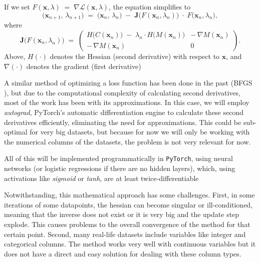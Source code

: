 \documentclass[12pt]{extarticle}
\numberwithin{equation}{section}
\begin{document}
If we set $F(\mathbf{x},\lambda) \;=\;\nabla \mathcal{L}(\mathbf{x},\lambda)$, 
the equation simplifies to
\begin{equation}\label{eq:newton_simplified}
\bigl(\mathbf{x}_{n+1},\,\lambda_{n+1}\bigr)
\;=\;
\bigl(\mathbf{x}_n,\,\lambda_n\bigr)
\;-\;
\mathbf{J}\!\bigl(F(\mathbf{x}_n,\lambda_n)\bigr)
\;\cdot\;
F\!\bigl(\mathbf{x}_n,\lambda_n\bigr),
\end{equation}
where
\begin{equation}\label{eq:hessian}
\mathbf{J}\!\bigl(F(\mathbf{x}_n,\lambda_n)\bigr)
\;=\;
\begin{pmatrix}
H\!\bigl(C(\mathbf{x}_n)\bigr)\;-\;\lambda_n \cdot H\!\bigl(M(\mathbf{x}_n)\bigr) 
    & -\,\nabla M(\mathbf{x}_n)
\\[6pt]
-\,\nabla M(\mathbf{x}_n)
    & 0
\end{pmatrix}.
\end{equation}
Above, $H(\cdot)$ denotes the Hessian (second derivative) with respect to $\mathbf{x}$, 
and $\nabla(\cdot)$ denotes the gradient (first derivative)

A similar method of optimizing a loss function has been done in the past (BFGS \cite{papakonstantinou2009historical}), 
but due to the computational complexity of calculating second derivatives, most of the work has been with its approximations. In this case, we will employ \emph{autograd}, PyTorch's automatic differentiation engine to calculate these second derivatives efficiently, eliminating the need for approximations. This could be sub-optimal for very big datasets, but because for now we will only be working with the numerical columns of the datasets, the problem is not very relevant for now.

All of this will be implemented programmatically in \texttt{PyTorch}, using neural networks (or logistic regressions if there are no hidden layers), which, using activations like \emph{sigmoid} or \emph{tanh}, are at least twice-differentiable

Notwithstanding, this mathematical approach has some challenges. 
First, in some iterations of some datapoints, the hessian can become singular or ill-conditioned, meaning that the inverse does not exist or it is very big and the update step explode. This causes problems to the overall convergence of the method for that certain point. 
Second, many real-life datasets include variables like integer and categorical columns. The method works very well with continuous variables but it does not have a direct and easy solution for dealing with these column types.
\end{document}

